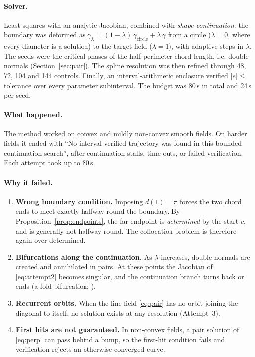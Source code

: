 \documentclass[11pt,a4paper]{article}
\numberwithin{equation}{section}
\theoremstyle{plain}
\theoremstyle{definition}
\theoremstyle{remark}
\begin{document}
\paragraph{Solver.} Least squares with an analytic Jacobian, combined with \emph{shape continuation}: the boundary was deformed as $\gamma_\lambda=(1-\lambda)\,\gamma_{\text{circle}}+\lambda\,\gamma$ from a circle ($\lambda=0$, where every diameter is a solution) to the target field ($\lambda=1$), with adaptive steps in $\lambda$. The seeds were the critical phases of the half-perimeter chord length, i.e. double normals (Section~\ref{sec:pair}). The spline resolution was then refined through 48, 72, 104 and 144 controls. Finally, an interval-arithmetic enclosure verified $|e|\le$ tolerance over every parameter subinterval. The budget was 80\,s in total and 24\,s per seed.

\paragraph{What happened.} The method worked on convex and mildly non-convex smooth fields. On harder fields it ended with ``No interval-verified trajectory was found in this bounded continuation search'', after continuation stalls, time-outs, or failed verification. Each attempt took up to 80\,s.

\paragraph{Why it failed.}
\begin{enumerate}
  \item \textbf{Wrong boundary condition.} Imposing $d(1)=\pi$ forces the two chord ends to meet exactly halfway round the boundary. By Proposition~\ref{prop:endpoints}, the far endpoint is \emph{determined} by the start $c$, and is generally not halfway round. The collocation problem is therefore again over-determined.
  \item \textbf{Bifurcations along the continuation.} As $\lambda$ increases, double normals are created and annihilated in pairs. At these points the Jacobian of \eqref{eq:attempt2} becomes singular, and the continuation branch turns back or ends (a fold bifurcation; \citealp{allgower2003}).
  \item \textbf{Recurrent orbits.} When the line field \eqref{eq:pair} has no orbit joining the diagonal to itself, no solution exists at any resolution (Attempt~3).
  \item \textbf{First hits are not guaranteed.} In non-convex fields, a pair solution of \eqref{eq:perp} can pass behind a bump, so the first-hit condition fails and verification rejects an otherwise converged curve.
\end{enumerate}
\end{document}
